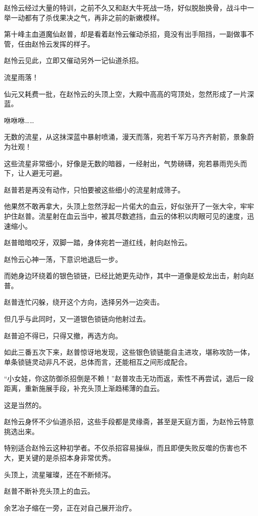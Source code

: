 \begin{this_body}
赵怜云经过大量的特训，之前不久又和赵大牛死战一场，好似脱胎换骨，战斗中一举一动都有了杀伐果决之气，再非之前的新嫩模样。

第十峰主血道魔仙赵普，却是看着赵怜云催动杀招，竟没有出手阻挡，一副做事不管，任由赵怜云发挥的样子。

赵怜云见此，立即又催动另外一记仙道杀招。

流星雨落！

仙元又耗费一批，在赵怜云的头顶上空，大殿中高高的穹顶处，忽然形成了一片深蓝。

咻咻咻……

无数的流星，从这抹深蓝中暴射喷涌，漫天而落，宛若千军万马齐齐射箭，景象蔚为壮观！

这些流星非常细小，好像是无数的暗器，一经射出，气势磅礴，宛若暴雨兜头而下，让人避无可避。

赵普若是再没有动作，只怕要被这些细小的流星射成筛子。

他果然不敢再拿大，头顶上忽然浮起一片偌大的血云，好似张开了一张大伞，牢牢护住赵普。流星射在血云当中，被其尽数遮挡，血云的体积以肉眼可见的速度，迅速缩小。

赵普暗暗咬牙，双脚一踏，身体宛若一道红线，射向赵怜云。

赵怜云心神一荡，下意识地退后一步。

而她身边环绕着的银色锁链，已经比她更先动作，其中一道像是蛟龙出击，射向赵普。

赵普连忙闪躲，绕开这个方向，选择另外一边突击。

但几乎与此同时，又一道银色锁链向他射过去。

赵普迫不得已，只得又撤，再选方向。

如此三番五次下来，赵普惊讶地发现，这些银色锁链能自主进攻，堪称攻防一体，单条锁链灵动非凡不说，总体而言，还能相互之间形成配合。

“小女娃，你这防御杀招倒是不赖！”赵普攻击无功而返，索性不再尝试，退后一段距离，重新施展手段，补充头顶上渐趋稀薄的血云。

这是当然的。

赵怜云身怀不少仙道杀招，这些手段都是灵缘斋，甚至是天庭方面，为赵怜云特意挑选出来。

特别适合赵怜云这种初学者。不仅杀招容易操纵，而且即便失败反噬的伤害也不大，更关键的是杀招本身非常优秀。

头顶上，流星璀璨，还在不断倾泻。

赵普不断补充头顶上的血云。

余艺冶子缩在一旁，正在对自己展开治疗。


\end{this_body}
